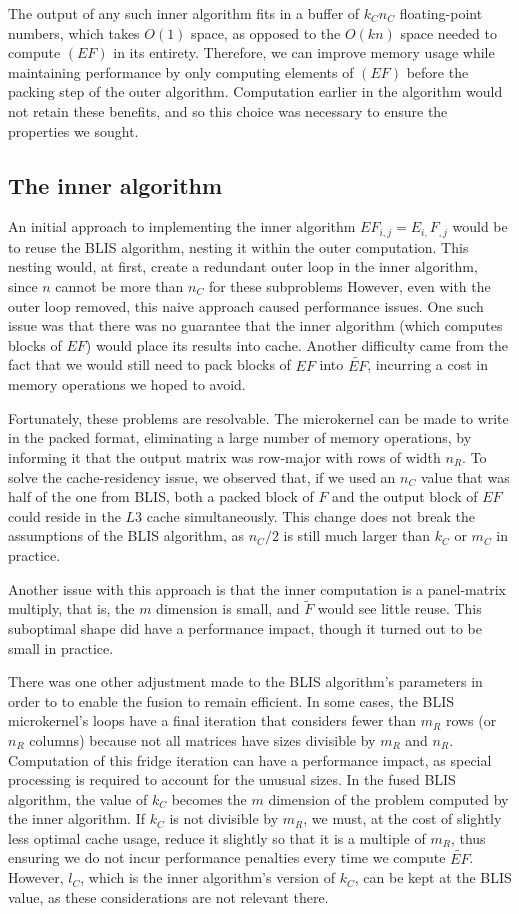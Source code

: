 \documentclass[12pt]{article}
\begin{document}
The output of any such inner algorithm fits in a buffer of $k_Cn_C$ floating-point numbers, which takes $O(1)$ space, as opposed to the $O(kn)$ space needed to compute $(EF)$ in its entirety.
Therefore, we can improve memory usage while maintaining performance by only computing elements of $(EF)$ before the packing step of the outer algorithm.
Computation earlier in the algorithm would not retain these benefits, and so this choice was necessary to ensure the properties we sought.

\subsection{The inner algorithm}
An initial approach to implementing the inner algorithm $EF_{i, j} = E_{i,}F_{,j}$ would be to reuse the BLIS algorithm, nesting it within the outer computation.
This nesting would, at first, create a redundant outer loop in the inner algorithm, since $n$ cannot be more than $n_C$ for these subproblems
However, even with the outer loop removed, this naive approach caused performance issues.
One such issue was that there was no guarantee that the inner algorithm (which computes blocks of $EF$) would place its results into cache.
Another difficulty came from the fact that we would still need to pack blocks of $EF$ into $\widetilde{EF}$, incurring a cost in memory operations we hoped to avoid.

Fortunately, these problems are resolvable.
The microkernel can be made to write in the packed format, eliminating a large number of memory operations, by informing it that the output matrix was row-major with rows of width $n_R$.
To solve the cache-residency issue, we observed that, if we used an $n_C$ value that was half of the one from BLIS, both a packed block of $F$ and the output block of $EF$ could reside in the $L3$ cache simultaneously.
This change does not break the assumptions of the BLIS algorithm, as $n_C/2$ is still much larger than $k_C$ or $m_C$ in practice.

Another issue with this approach is that the inner computation is a panel-matrix multiply, that is, the $m$ dimension is small, and $\widetilde{F}$ would see little reuse.
This suboptimal shape did have a performance impact, though it turned out to be small in practice.

There was one other adjustment made to the BLIS algorithm's parameters in order to to enable the fusion to remain efficient.
In some cases, the BLIS microkernel's loops have a final iteration that considers fewer than $m_R$ rows (or $n_R$ columns) because not all matrices have sizes divisible by $m_R$ and $n_R$.
Computation of this fridge iteration can have a performance impact, as special processing is required to account for the unusual sizes.
In the fused BLIS algorithm, the value of $k_C$ becomes the $m$ dimension of the problem computed by the inner algorithm.
If $k_C$ is not divisible by $m_R$, we must, at the cost of slightly less optimal cache usage, reduce it slightly so that it is a multiple of $m_R$, thus ensuring we do not incur performance penalties every time we compute $\widetilde{EF}$.
However, $l_C$, which is the inner algorithm's version of $k_C$, can be kept at the BLIS value, as these considerations are not relevant there.
\end{document}
